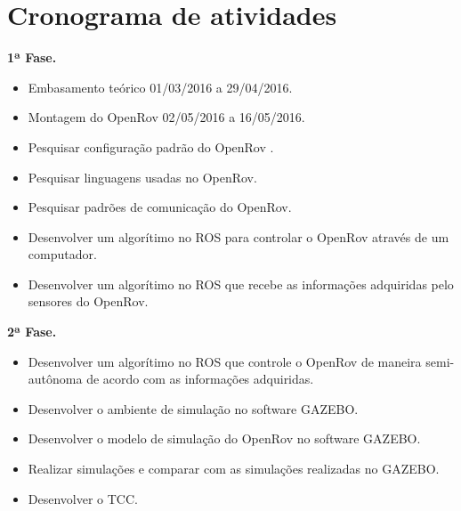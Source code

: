 \chapter{Cronograma de atividades}






\textbf{\large 1ª Fase.}
 
\begin{itemize}

	\item Embasamento teórico 01/03/2016 a 29/04/2016.
	\item Montagem do OpenRov 02/05/2016 a 16/05/2016.
	\item Pesquisar configuração padrão do OpenRov .
	\item Pesquisar linguagens usadas no OpenRov.
	\item Pesquisar padrões de comunicação do OpenRov.
	\item Desenvolver um algorítimo no ROS para controlar o OpenRov através de um computador.
	\item Desenvolver um algorítimo no ROS que recebe as informações adquiridas pelo sensores do OpenRov.

\end{itemize}

 \textbf{\large 2ª Fase.}
 
\begin{itemize}

	\item Desenvolver um algorítimo no ROS que controle o OpenRov de maneira semi-autônoma de acordo com as informações adquiridas.
    \item Desenvolver o ambiente de simulação no software GAZEBO.
	\item Desenvolver o modelo de simulação do OpenRov no software GAZEBO.
	\item Realizar simulações e comparar com as simulações realizadas no GAZEBO.
	\item Desenvolver o TCC.

\end{itemize}
